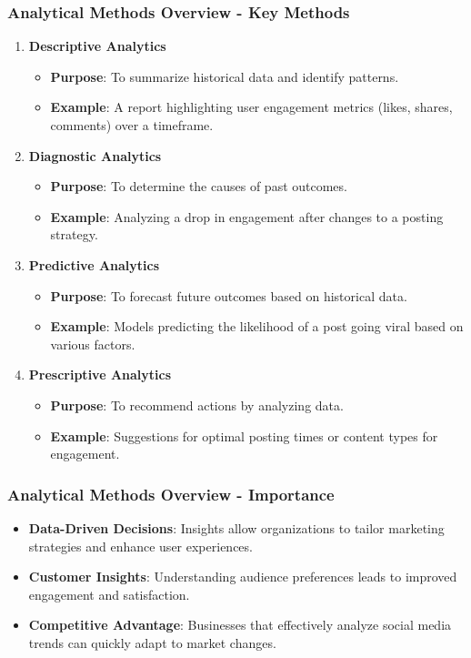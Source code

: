 \documentclass{beamer}
\begin{document}
\begin{frame}[fragile]
    \frametitle{Analytical Methods Overview - Key Methods}
    \begin{enumerate}
        \item \textbf{Descriptive Analytics}
            \begin{itemize}
                \item \textbf{Purpose}: To summarize historical data and identify patterns.
                \item \textbf{Example}: A report highlighting user engagement metrics (likes, shares, comments) over a timeframe.
            \end{itemize}

        \item \textbf{Diagnostic Analytics}
            \begin{itemize}
                \item \textbf{Purpose}: To determine the causes of past outcomes.
                \item \textbf{Example}: Analyzing a drop in engagement after changes to a posting strategy.
            \end{itemize}

        \item \textbf{Predictive Analytics}
            \begin{itemize}
                \item \textbf{Purpose}: To forecast future outcomes based on historical data.
                \item \textbf{Example}: Models predicting the likelihood of a post going viral based on various factors.
            \end{itemize}

        \item \textbf{Prescriptive Analytics}
            \begin{itemize}
                \item \textbf{Purpose}: To recommend actions by analyzing data.
                \item \textbf{Example}: Suggestions for optimal posting times or content types for engagement.
            \end{itemize}
    \end{enumerate}
\end{frame}

\begin{frame}[fragile]
    \frametitle{Analytical Methods Overview - Importance}
    \begin{itemize}
        \item \textbf{Data-Driven Decisions}: Insights allow organizations to tailor marketing strategies and enhance user experiences.
        \item \textbf{Customer Insights}: Understanding audience preferences leads to improved engagement and satisfaction.
        \item \textbf{Competitive Advantage}: Businesses that effectively analyze social media trends can quickly adapt to market changes.
    \end{itemize}
\end{frame}
\end{document}
